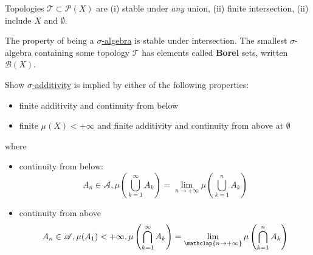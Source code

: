\documentclass{article}
\newcommand{\powerset}{\mathscr{P}}
\begin{document}
\begin{remark}
    Topologies $\mathscr{T} \subset \powerset(X)$ are (i) stable under \textit{any} union, (ii) finite intersection, (ii) include $X$ and $\emptyset$.
\end{remark}

\begin{remark}
    The property of being a \hyperlink{def:sigAlg}{$\sigma$-algebra} is stable under intersection.
    The smallest $\sigma$-algebra containing some topology $\mathscr{T}$ has elements called \hypertarget{def:borelSet}{\textbf{Borel} sets}, written $\mathcal{B}(X)$.
\end{remark}


\begin{ex}
    Show \hyperlink{def:sigAdd}{$\sigma$-additivity} is implied by either of the following properties:
    \begin{itemize}
        \item finite additivity and continuity from below
        \item finite $\mu(X) < +\infty$ and finite additivity and continuity from above at $\emptyset$
    \end{itemize}
    where
    \begin{itemize}
        \item continuity from below:
            \begin{equation*}
                A_n \in \mathscr{A}, \mu\left(\bigcup_{k=1}^\infty A_k\right)  = \lim_{n \to +\infty} \mu\left(\bigcup_{k=1}^n A_k\right)
            \end{equation*}
        \item continuity from above
            \begin{equation*}
                A_n \in \mathscr{A}, \mu(A_1) < +\infty, \mu\left(\bigcap_{k=1}^\infty A_k\right)  = \lim_{\mathclap{n \to +\infty}} \mu\left(\bigcap_{k=1}^n A_k\right)
            \end{equation*}
    \end{itemize}
\end{ex}
\end{document}
